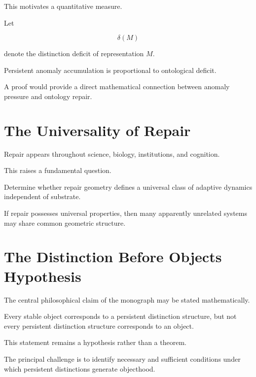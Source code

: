 \documentclass[11pt,oneside,openany]{book}
\begin{document}
This motivates a quantitative measure.

Let

\[
\delta(M)
\]

denote the distinction deficit of representation \(M\).

\begin{conjecture}

Persistent anomaly accumulation is proportional to ontological deficit.

\end{conjecture}

A proof would provide a direct mathematical connection between anomaly pressure and ontology repair.

\section{The Universality of Repair}

Repair appears throughout science, biology, institutions, and cognition.

This raises a fundamental question.

\begin{problem}

Determine whether repair geometry defines a universal class of adaptive dynamics independent of substrate.

\end{problem}

If repair possesses universal properties, then many apparently unrelated systems may share common geometric structure.

\section{The Distinction Before Objects Hypothesis}

The central philosophical claim of the monograph may be stated mathematically.

\begin{hypothesis}

Every stable object corresponds to a persistent distinction structure, but not every persistent distinction structure corresponds to an object.

\end{hypothesis}

This statement remains a hypothesis rather than a theorem.

The principal challenge is to identify necessary and sufficient conditions under which persistent distinctions generate objecthood.
\end{document}
